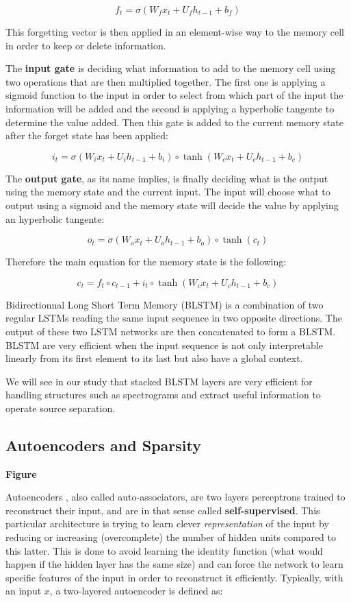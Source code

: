 \documentclass[master,final,11pt]{iscs-thesis}
\begin{document}
\[f_t = \sigma(W_{f} x_t + U_{f} h_{t-1} + b_f)\]

This forgetting vector is then applied in an element-wise way to the memory cell in order to keep or delete information.

The \textbf{input gate} is deciding what information to add to the memory cell using two operations that are then multiplied together. The first one is applying a sigmoid function to the input in order to select from which part of the input the information will be added and the second is applying a hyperbolic tangente to determine the value added. Then this gate is added to the current memory state after the forget state has been applied:

\[i_t = \sigma(W_{i} x_t + U_{i} h_{t-1} + b_i) \circ \tanh(W_{c} x_t + U_{c} h_{t-1} + b_c)\]

The \textbf{output gate}, as its name implies, is finally deciding what is the output using the memory state and the current input. The input will choose what to output using a sigmoid and the memory state will decide the value by applying an hyperbolic tangente:

\[o_t = \sigma(W_{o} x_t + U_{o} h_{t-1} + b_o) \circ \tanh(c_t)\]

Therefore the main equation for the memory state is the following:

\[c_t = f_t \circ c_{t-1} + i_t \circ \tanh(W_{c} x_t + U_{c} h_{t-1} + b_c)\]

Bidirectionnal Long Short Term Memory (BLSTM) is a combination of two regular LSTMs reading the same input sequence in two opposite directions. The output of these two LSTM networks are then concatenated to form a BLSTM. BLSTM are very efficient when the input sequence is not only interpretable linearly from its first element to its last but also have a global context.

We will see in our study that stacked BLSTM layers are very efficient for handling structures such as spectrograms and extract useful information to operate source separation.

\subsection{Autoencoders and Sparsity}
\label{AE}

\textbf{Figure}

Autoencoders \cite{AE}, also called auto-associators, are two layers perceptrons trained to reconstruct their input, and are in that sense called \textbf{self-supervised}. This particular architecture is trying to learn clever \textit{representation} of the input by reducing or increasing (overcomplete) the number of hidden units compared to this latter. This is done to avoid learning the identity function (what would happen if the hidden layer has the same size) and can force the network to learn specific features of the input in order to reconstruct it efficiently. Typically, with an input $x$, a two-layered autoencoder is defined as:
\end{document}
